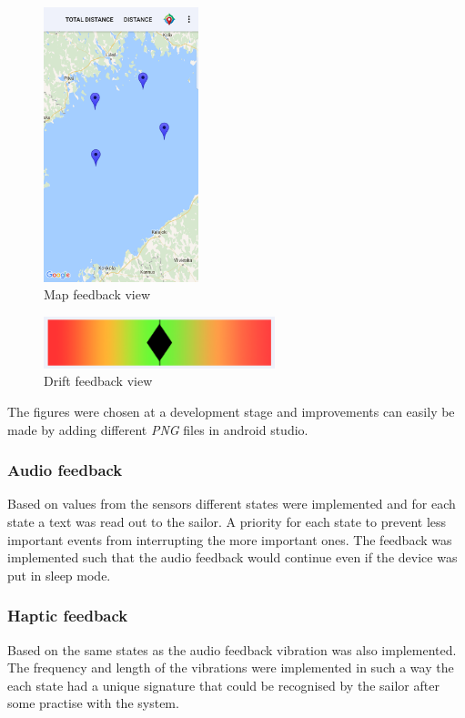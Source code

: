 \begin{figure}[H]
\centering
\includegraphics[width=0.4\textwidth]{Figures/map.png}
\caption{Map feedback view}
\label{feedback-map}
\end{figure}
\begin{figure}[H]
\centering
\includegraphics[width=0.6\textwidth]{Figures/drift.png}
\caption{Drift feedback view}
\label{feedback-drift}
\end{figure}
The figures were chosen at a development stage and improvements can easily be made by adding different \textit{PNG} files in android studio.

\subsubsection{Audio feedback}
Based on values from the sensors different states were implemented and for each state a text was read out to the sailor. A priority for each state to prevent less important events from interrupting the more important ones. The feedback was implemented such that the audio feedback would continue even if the device was put in sleep mode.

\subsubsection{Haptic feedback}
Based on the same states as the audio feedback vibration was also implemented. The frequency and length of the vibrations were implemented in such a way the each state had a unique signature that could be recognised by the sailor after some practise with the system.

